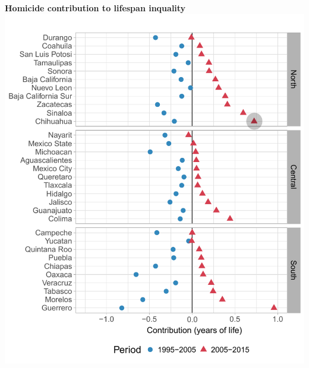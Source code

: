 \documentclass[xcolor={dvipsnames}]{beamer}
\begin{document}
\begin{frame}
	\begin{center}
		\Large{\textbf{Homicide contribution to lifespan inquality}}
		\includegraphics[scale=.47]{Figures/Figure_42}
	\end{center}

\end{frame}
\end{document}
